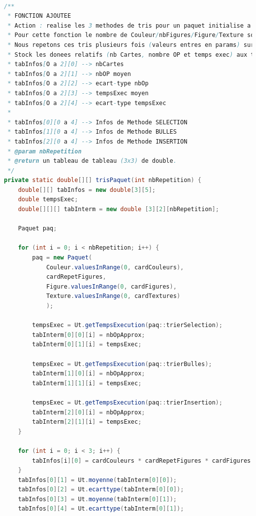 \documentclass{report}
\begin{document}
\begin{lstlisting}[language=java, caption={\it Fonctions de calculs de données expérimentales}, label=codeTRI]

/**
 * FONCTION AJOUTEE
 * Action : realise les 3 methodes de tris pour un paquet initialise a nbCartes nombre de carte.
 * Pour cette fonction le nombre de Couleur/nbFigures/Figure/Texture sont fixes (variables de classes : cardCouleurs, cardRepetFigures, cardFigures, cardTextures).
 * Nous repetons ces tris plusieurs fois (valeurs entres en params) sur des paquets presentant les memes caracteristiques mais melanges differremment ; pour obtenir des donnees significatifs :
 * Stock les donees relatifs (nb Cartes, nombre OP et temps exec) aux tris dans un tableau de tableau.
 * tabInfos[O a 2][0] --> nbCartes
 * tabInfos[O a 2][1] --> nbOP moyen
 * tabInfos[O a 2][2] --> ecart-type nbOp
 * tabInfos[O a 2][3] --> tempsExec moyen
 * tabInfos[O a 2][4] --> ecart-type tempsExec
 * 
 * tabInfos[0][0 a 4] --> Infos de Methode SELECTION
 * tabInfos[1][0 a 4] --> Infos de Methode BULLES
 * tabInfos[2][0 a 4] --> Infos de Methode INSERTION
 * @param nbRepetition
 * @return un tableau de tableau (3x3) de double.
 */
private static double[][] trisPaquet(int nbRepetition) {
    double[][] tabInfos = new double[3][5];
    double tempsExec;
    double[][][] tabInterm = new double [3][2][nbRepetition];

    Paquet paq;

    for (int i = 0; i < nbRepetition; i++) {
        paq = new Paquet(
            Couleur.valuesInRange(0, cardCouleurs), 
            cardRepetFigures, 
            Figure.valuesInRange(0, cardFigures), 
            Texture.valuesInRange(0, cardTextures)
            );

        tempsExec = Ut.getTempsExecution(paq::trierSelection);
        tabInterm[0][0][i] = nbOpApprox;
        tabInterm[0][1][i] = tempsExec;

        tempsExec = Ut.getTempsExecution(paq::trierBulles);
        tabInterm[1][0][i] = nbOpApprox;
        tabInterm[1][1][i] = tempsExec;

        tempsExec = Ut.getTempsExecution(paq::trierInsertion);
        tabInterm[2][0][i] = nbOpApprox;
        tabInterm[2][1][i] = tempsExec;   
    }

    for (int i = 0; i < 3; i++) {
        tabInfos[i][0] = cardCouleurs * cardRepetFigures * cardFigures * cardTextures;
    }
    tabInfos[0][1] = Ut.moyenne(tabInterm[0][0]);
    tabInfos[0][2] = Ut.ecarttype(tabInterm[0][0]);
    tabInfos[0][3] = Ut.moyenne(tabInterm[0][1]);
    tabInfos[0][4] = Ut.ecarttype(tabInterm[0][1]);
    

\end{lstlisting}
\end{document}
